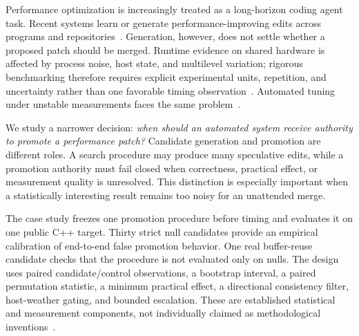 \documentclass[10pt]{article}
\begin{document}
Performance optimization is increasingly treated as a long-horizon coding
agent task.  Recent systems learn or generate performance-improving edits
across programs and repositories~\citep{shypula2024}.  Generation, however,
does not settle whether a proposed patch should be merged.  Runtime evidence
on shared hardware is affected by process noise, host state, and multilevel
variation; rigorous benchmarking therefore requires explicit experimental
units, repetition, and uncertainty rather than one favorable timing
observation~\citep{georges2007,kalibera2013}.  Automated tuning under unstable
measurements faces the same problem~\citep{tuna2025}.

We study a narrower decision: \emph{when should an automated system receive
authority to promote a performance patch?}  Candidate generation and promotion
are different roles.  A search procedure may produce many speculative edits,
while a promotion authority must fail closed when correctness, practical
effect, or measurement quality is unresolved.  This distinction is especially
important when a statistically interesting result remains too noisy for an
unattended merge.

The case study freezes one promotion procedure before timing and evaluates it
on one public C++ target.  Thirty strict null candidates provide an empirical
calibration of end-to-end false promotion behavior.  One real buffer-reuse
candidate checks that the procedure is not evaluated only on nulls.  The
design uses paired candidate/control observations, a bootstrap interval, a
paired permutation statistic, a minimum practical effect, a directional
consistency filter, host-weather gating, and bounded escalation.  These are
established statistical and measurement components, not individually claimed
as methodological inventions~\citep{efron1993,good2005}.
\end{document}
